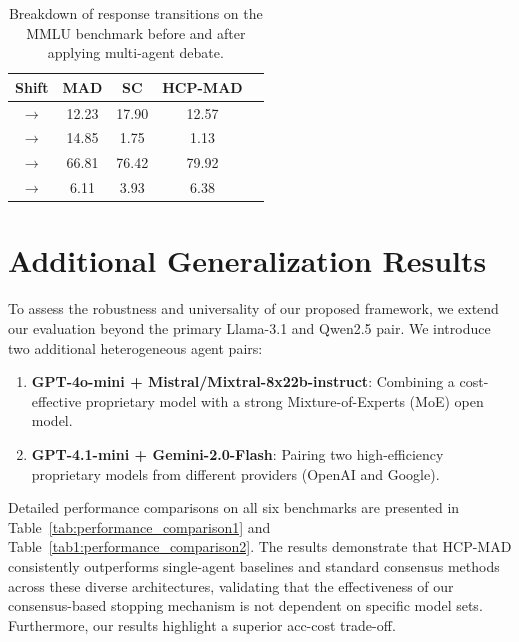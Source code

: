 \documentclass[11pt]{article}
\newcommand{\cmark}{\ding{51}}
\newcommand{\xmark}{\ding{55}}
\begin{document}
\begin{table}
\centering
\fontsize{9pt}{9.5pt}\selectfont
\begin{tabular}{c|cccc}
\toprule
 \textbf{Shift} & \textbf{MAD} & \textbf{SC} & \textbf{HCP-MAD} \\
\midrule
\textcolor{red}\xmark $\to$  \textcolor{red}\xmark & 12.23 & 17.90 & 12.57 \\
\textcolor{green!60!black} \cmark $\to$ \textcolor{red}\xmark &  14.85 &  1.75 &  1.13 \\
\textcolor{green!60!black}\cmark $\to$ \textcolor{green!60!black}\cmark & 66.81 & 76.42 & 79.92 \\
\textcolor{red}\xmark $\to$ \textcolor{green!60!black} \cmark&  6.11 &  3.93 &  6.38 \\
\bottomrule
\end{tabular}
    \caption{Breakdown of response transitions on the MMLU benchmark before and after applying multi-agent debate.%
    }
\label{tab:flip_analysis}
\vspace{-1.0em}
\end{table}


\section{Additional Generalization Results}
\label{sec:appendix_generalization}

To assess the robustness and universality of our proposed framework, we extend our evaluation beyond the primary Llama-3.1 and Qwen2.5 pair. We introduce two additional heterogeneous agent pairs:
\begin{enumerate}
    \item \textbf{GPT-4o-mini + Mistral/Mixtral-8x22b-instruct}:
    Combining a cost-effective proprietary model with a strong Mixture-of-Experts (MoE) open model.
    \item \textbf{GPT-4.1-mini + Gemini-2.0-Flash}: Pairing two high-efficiency proprietary models from different providers (OpenAI and Google).
\end{enumerate}

Detailed performance comparisons on all six benchmarks are presented in Table~\ref{tab:performance_comparison1} and Table~\ref{tab1:performance_comparison2}. The results demonstrate that HCP-MAD consistently outperforms single-agent baselines and standard consensus methods across these diverse architectures, validating that the effectiveness of our consensus-based stopping mechanism is not dependent on specific model sets. Furthermore, our results highlight a superior acc-cost trade-off.
\end{document}
